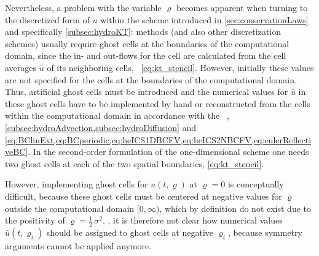 Nevertheless, a problem with the variable $\varrho$ becomes apparent when turning to the discretized form of $u$ within the \fv{} scheme introduced in \cref{sec:conservationLaws} and specifically \cref{subsec:hydroKT}: \fv{} methods (and also other discretization schemes) usually require ghost cells at the boundaries of the computational domain, since the in- and out-flows for the  cell are calculated from the cell averages $\bar{u}$ of its neighboring cells, \cf{}\ \cref{eq:kt_stencil}.
However, initially these values are not specified for the cells at the boundaries of the computational domain.
Thus, artificial ghost cells must be introduced and the numerical values for $\bar{u}$ in these ghost cells have to be implemented by hand or reconstructed from the cells within the computational domain in accordance with the \bcs{}~\cite{LeVeque:1992,LeVeque:2002}, \cf{} \cref{subsec:hydroAdvection,subsec:hydroDiffusion} and \cref{eq:BClinExt,eq:BCperiodic,eq:heICS1DBCFV,eq:heICS2NBCFV,eq:eulerReflectiveBC}.
In the second-order formulation of the one-dimensional \kt{} scheme one needs two ghost cells at each of the two spatial boundaries, \cf{} \cref{eq:kt_stencil}.

However, implementing ghost cells for $u ( t, \varrho )$ at $\varrho = 0$ is conceptually difficult, because these ghost cells must be centered at negative values for $\varrho$ outside the computational domain $[ 0, \infty)$, which by definition do not exist due to the positivity of $\varrho = \tfrac{1}{2}\,\sigma^2$.
\Apriori{}, it is therefore not clear how numerical values $\bar{u} ( t, \varrho_i )$ should be assigned to ghost cells at negative $\varrho_i$, because symmetry arguments cannot be applied anymore.

